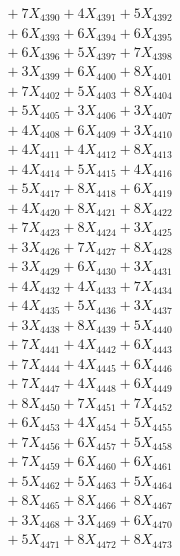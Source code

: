 \documentclass[a4paper,10pt]{article}
\begin{document}
{\begin{align}
&\;  + 7 X_{4390} + 4 X_{4391} + 5 X_{4392} \\[0.3ex]
&\;  + 6 X_{4393} + 6 X_{4394} + 6 X_{4395} \\[0.3ex]
&\;  + 6 X_{4396} + 5 X_{4397} + 7 X_{4398} \\[0.3ex]
&\;  + 3 X_{4399} + 6 X_{4400} + 8 X_{4401} \\[0.3ex]
&\;  + 7 X_{4402} + 5 X_{4403} + 8 X_{4404} \\[0.3ex]
&\;  + 5 X_{4405} + 3 X_{4406} + 3 X_{4407} \\[0.3ex]
&\;  + 4 X_{4408} + 6 X_{4409} + 3 X_{4410} \\[0.3ex]
&\;  + 4 X_{4411} + 4 X_{4412} + 8 X_{4413} \\[0.3ex]
&\;  + 4 X_{4414} + 5 X_{4415} + 4 X_{4416} \\[0.3ex]
&\;  + 5 X_{4417} + 8 X_{4418} + 6 X_{4419} \\[0.5ex]\allowbreak
&\;  + 4 X_{4420} + 8 X_{4421} + 8 X_{4422} \\[0.3ex]
&\;  + 7 X_{4423} + 8 X_{4424} + 3 X_{4425} \\[0.3ex]
&\;  + 3 X_{4426} + 7 X_{4427} + 8 X_{4428} \\[0.3ex]
&\;  + 3 X_{4429} + 6 X_{4430} + 3 X_{4431} \\[0.3ex]
&\;  + 4 X_{4432} + 4 X_{4433} + 7 X_{4434} \\[0.3ex]
&\;  + 4 X_{4435} + 5 X_{4436} + 3 X_{4437} \\[0.3ex]
&\;  + 3 X_{4438} + 8 X_{4439} + 5 X_{4440} \\[0.3ex]
&\;  + 7 X_{4441} + 4 X_{4442} + 6 X_{4443} \\[0.3ex]
&\;  + 7 X_{4444} + 4 X_{4445} + 6 X_{4446} \\[0.3ex]
&\;  + 7 X_{4447} + 4 X_{4448} + 6 X_{4449} \\[0.5ex]\allowbreak
&\;  + 8 X_{4450} + 7 X_{4451} + 7 X_{4452} \\[0.3ex]
&\;  + 6 X_{4453} + 4 X_{4454} + 5 X_{4455} \\[0.3ex]
&\;  + 7 X_{4456} + 6 X_{4457} + 5 X_{4458} \\[0.3ex]
&\;  + 7 X_{4459} + 6 X_{4460} + 6 X_{4461} \\[0.3ex]
&\;  + 5 X_{4462} + 5 X_{4463} + 5 X_{4464} \\[0.3ex]
&\;  + 8 X_{4465} + 8 X_{4466} + 8 X_{4467} \\[0.3ex]
&\;  + 3 X_{4468} + 3 X_{4469} + 6 X_{4470} \\[0.3ex]
&\;  + 5 X_{4471} + 8 X_{4472} + 8 X_{4473} \\[0.3ex]

\end{align}}
\end{document}
